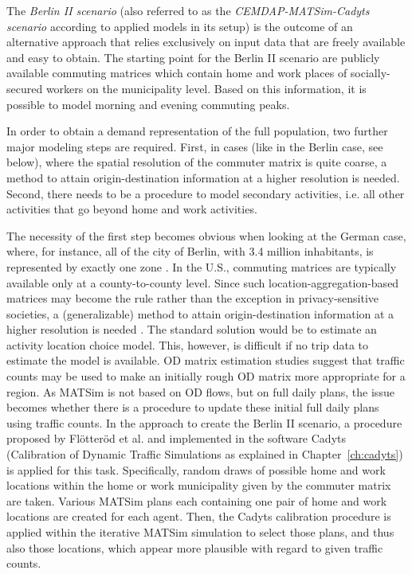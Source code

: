 The \textit{Berlin II scenario} (also referred to as the \textit{CEMDAP-MATSim-Cadyts scenario} according to applied models in its setup) is the outcome of an alternative approach that relies exclusively on input data that are freely available and easy to obtain. The starting point for the Berlin II scenario are publicly available commuting matrices which contain home and work places of socially-secured workers on the municipality level. Based on this information, it is possible to model morning and evening commuting peaks.

In order to obtain a demand representation of the full population, two further major modeling steps are required. First, in cases (like in the Berlin case, see below), where the spatial resolution of the commuter matrix is quite coarse, a method to attain origin-destination information at a higher resolution is needed. Second, there needs to be a procedure to model secondary activities, i.e. all other activities that go beyond home and work activities.

The necessity of the first step becomes obvious when looking at the German case, where, for instance, all of the city of Berlin, with 3.4 million inhabitants, is represented by exactly one zone \citep{BA2010Pendlerstatistik}. In the U.S., commuting matrices are typically available only at a county-to-county level. Since such location-aggregation-based matrices may become the rule rather than the exception in privacy-sensitive societies, a (generalizable) method to attain origin-destination information at a higher resolution is needed \citep{ ZiemkeNagelBhat2015IntegratingCemdapMatsimTransferabilityTRB}. The standard solution would be to estimate an activity location choice model. This, however, is difficult if no trip data to estimate the model is available. OD matrix estimation studies \citep{ZuylenWillumsenMatrix-from-cnts} suggest that traffic counts may be used to make an initially rough OD matrix more appropriate for a region. As MATSim is not based on OD flows, but on full daily plans, the issue becomes whether there is a procedure to update these initial full daily plans using traffic counts. In the approach to create the Berlin II scenario, a procedure proposed by Flötteröd et al. \citep{FloetteroedBierlaireNagel2010Bayesian} and implemented in the software Cadyts (Calibration of Dynamic Traffic Simulations \citep{Floetteroed2010Manual110} as explained in Chapter~\ref{ch:cadyts}) is applied for this task. Specifically, random draws of possible home and work locations within the home or work municipality given by the commuter matrix are taken. Various MATSim plans each containing one pair of home and work locations are created for each agent. Then, the Cadyts calibration procedure is applied within the iterative MATSim simulation to select those plans, and thus also those locations, which appear more plausible with regard to given traffic counts.


